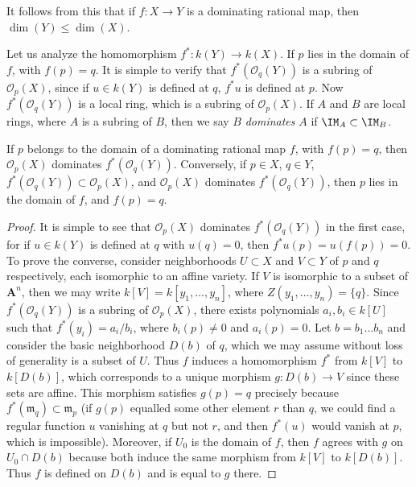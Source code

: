 \begin{remark}
    It follows from this that if $f: X \to Y$ is a dominating rational map, then $\dim(Y) \leq \dim(X)$.
\end{remark}

Let us analyze the homomorphism $f^*: k(Y) \to k(X)$. If $p$ lies in the domain of $f$, with $f(p) = q$. It is simple to verify that $f^*(\mathcal{O}_q(Y))$ is a subring of $\mathcal{O}_p(X)$, since if $u \in k(Y)$ is defined at $q$, $f^*u$ is defined at $p$. Now $f^*(\mathcal{O}_q(Y))$ is a local ring, which is a subring of $\mathcal{O}_p(X)$. If $A$ and $B$ are local rings, where $A$ is a subring of $B$, then we say $B$ \emph{dominates} $A$ if $\IM_A \subset \IM_B$.

\begin{theorem}
    If $p$ belongs to the domain of a dominating rational map $f$, with $f(p) = q$, then $\mathcal{O}_p(X)$ dominates $f^*(\mathcal{O}_q(Y))$. Conversely, if $p \in X$, $q \in Y$, $f^*(\mathcal{O}_q(Y)) \subset \mathcal{O}_p(X)$, and $\mathcal{O}_p(X)$ dominates $f^*(\mathcal{O}_q(Y))$, then $p$ lies in the domain of $f$, and $f(p) = q$.
\end{theorem}
\begin{proof}
    It is simple to see that $\mathcal{O}_p(X)$ dominates $f^*(\mathcal{O}_q(Y))$ in the first case, for if $u \in k(Y)$ is defined at $q$ with $u(q) = 0$, then $f^*u(p) = u(f(p)) = 0$. To prove the converse, consider neighborhoods $U \subset X$ and $V \subset Y$ of $p$ and $q$ respectively, each isomorphic to an affine variety. If $V$ is isomorphic to a subset of $\mathbf{A}^n$, then we may write $k[V] = k[y_1,\dots,y_n]$, where $Z(y_1,\dots,y_n) = \{ q \}$. Since $f^*(\mathcal{O}_q(Y))$ is a subring of $\mathcal{O}_p(X)$, there exists polynomials $a_i,b_i \in k[U]$ such that $f^*(y_i) = a_i/b_i$, where $b_i(p) \neq 0$ and $a_i(p) = 0$. Let $b = b_1 \dots b_n$ and consider the basic neighborhood $D(b)$ of $q$, which we may assume without loss of generality is a subset of $U$. Thus $f$ induces a homomorphism $f^*$ from $k[V]$ to $k[D(b)]$, which corresponds to a unique morphism $g: D(b) \to V$ since these sets are affine. This morphism satisfies $g(p) = q$ precisely because $f^*(\mathfrak{m}_q) \subset \mathfrak{m}_p$ (if $g(p)$ equalled some other element $r$ than $q$, we could find a regular function $u$ vanishing at $q$ but not $r$, and then $f^*(u)$ would vanish at $p$, which is impossible). Moreover, if $U_0$ is the domain of $f$, then $f$ agrees with $g$ on $U_0 \cap D(b)$ because both induce the same morphism from $k[V]$ to $k[D(b)]$. Thus $f$ is defined on $D(b)$ and is equal to $g$ there.
\end{proof}

